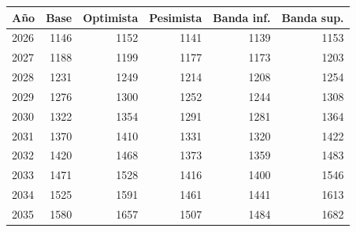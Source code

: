 
\begin{tabular}{lrrrrr}
\toprule
Año & Base & Optimista & Pesimista & Banda inf. & Banda sup.\\
\midrule
2026 & 1146 & 1152 & 1141 & 1139 & 1153\\
2027 & 1188 & 1199 & 1177 & 1173 & 1203\\
2028 & 1231 & 1249 & 1214 & 1208 & 1254\\
2029 & 1276 & 1300 & 1252 & 1244 & 1308\\
2030 & 1322 & 1354 & 1291 & 1281 & 1364\\
2031 & 1370 & 1410 & 1331 & 1320 & 1422\\
2032 & 1420 & 1468 & 1373 & 1359 & 1483\\
2033 & 1471 & 1528 & 1416 & 1400 & 1546\\
2034 & 1525 & 1591 & 1461 & 1441 & 1613\\
2035 & 1580 & 1657 & 1507 & 1484 & 1682\\
\bottomrule
\end{tabular}
